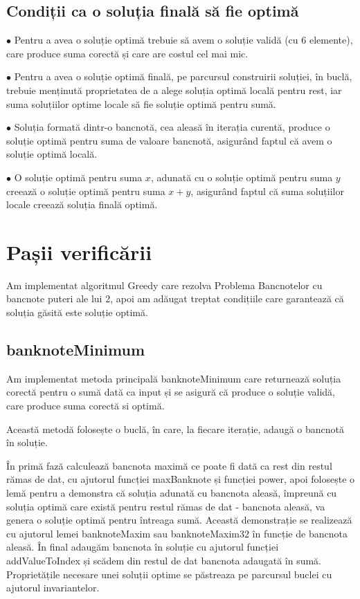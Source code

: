     \subsection{Condiții ca o soluția finală să fie optimă}
    $\bullet$ Pentru a avea o soluție optimă trebuie să avem o soluție validă (cu 6 elemente), care produce suma corectă
     și care are costul cel mai mic.\par
    $\bullet$ Pentru a avea o soluție optimă finală, pe parcursul construirii soluției, în buclă, trebuie menținută proprietatea
     de a alege soluția optimă locală pentru rest, iar suma soluțiilor optime locale să fie soluție optimă pentru sumă.\par
    $\bullet$ Soluția formată dintr-o bancnotă, cea aleasă în iterația curentă, produce o soluție optimă pentru suma 
    de valoare bancnotă, asigurând faptul că avem o soluție optimă locală.\par
    $\bullet$ O soluție optimă pentru suma $x$, adunată cu o soluție optimă pentru suma $y$ creează o soluție optimă pentru suma $x+y$, 
    asigurând faptul că suma soluțiilor locale creează soluția finală optimă.\par
    
\section{Pașii verificării}
Am implementat algoritmul Greedy care rezolva Problema Bancnotelor cu bancnote puteri ale lui 2, 
apoi am adăugat treptat condițiile care garantează că soluția găsită este soluție optimă.
    \subsection{banknoteMinimum}
    Am implementat metoda principală banknoteMinimum care returnează soluția corectă pentru o sumă dată ca input
    și se asigură că produce o soluție validă, care produce suma corectă si optimă.\par
    Această metodă folosește o buclă, în care, la fiecare iterație, adaugă o bancnotă în soluție.\par
    În primă fază calculează bancnota maximă ce poate fi dată ca rest din restul rămas de dat, cu ajutorul funcției 
    maxBanknote și funcției power, apoi folosește o lemă pentru a demonstra că soluția adunată cu bancnota aleasă, 
    împreună cu soluția optimă care există pentru restul rămas de dat - bancnota aleasă, va genera o soluție optimă 
    pentru întreaga sumă. Această demonstrație se realizează cu ajutorul lemei banknoteMaxim sau banknoteMaxim32 în 
    funcție de bancnota aleasă. 
    În final adaugăm bancnota în soluție cu ajutorul funcției addValueToIndex și scădem din restul de dat bancnota 
    adaugată în sumă.
    Proprietățile necesare unei soluții optime se păstreaza pe parcursul buclei cu ajutorul invariantelor.
     
